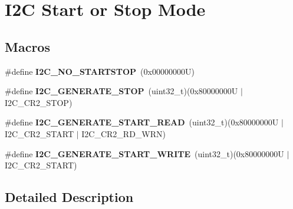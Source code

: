 \hypertarget{group___i2_c___s_t_a_r_t___s_t_o_p___m_o_d_e}{}\section{I2C Start or Stop Mode}
\label{group___i2_c___s_t_a_r_t___s_t_o_p___m_o_d_e}
\subsection*{Macros}
\begin{DoxyCompactItemize}
\item 
\mbox{\label{group___i2_c___s_t_a_r_t___s_t_o_p___m_o_d_e_ga72be0683a5cddcd2eb8d09034becf0f8}} 
\#define {\bfseries I2\+C\+\_\+\+N\+O\+\_\+\+S\+T\+A\+R\+T\+S\+T\+OP}~(0x00000000\+U)
\item 
\mbox{\label{group___i2_c___s_t_a_r_t___s_t_o_p___m_o_d_e_gabd6e763d5c32da220e64aa6e726ebad8}} 
\#define {\bfseries I2\+C\+\_\+\+G\+E\+N\+E\+R\+A\+T\+E\+\_\+\+S\+T\+OP}~(uint32\+\_\+t)(0x80000000\+U $\vert$ I2\+C\+\_\+\+C\+R2\+\_\+\+S\+T\+O\+P)
\item 
\mbox{\label{group___i2_c___s_t_a_r_t___s_t_o_p___m_o_d_e_ga3ec0ba1daf9639ed559f829a5b95549b}} 
\#define {\bfseries I2\+C\+\_\+\+G\+E\+N\+E\+R\+A\+T\+E\+\_\+\+S\+T\+A\+R\+T\+\_\+\+R\+E\+AD}~(uint32\+\_\+t)(0x80000000\+U $\vert$ I2\+C\+\_\+\+C\+R2\+\_\+\+S\+T\+A\+R\+T $\vert$ I2\+C\+\_\+\+C\+R2\+\_\+\+R\+D\+\_\+\+W\+R\+N)
\item 
\mbox{\label{group___i2_c___s_t_a_r_t___s_t_o_p___m_o_d_e_ga727eba0ee24dbd8b0f5110f242712ea1}} 
\#define {\bfseries I2\+C\+\_\+\+G\+E\+N\+E\+R\+A\+T\+E\+\_\+\+S\+T\+A\+R\+T\+\_\+\+W\+R\+I\+TE}~(uint32\+\_\+t)(0x80000000\+U $\vert$ I2\+C\+\_\+\+C\+R2\+\_\+\+S\+T\+A\+R\+T)
\end{DoxyCompactItemize}


\subsection{Detailed Description}
